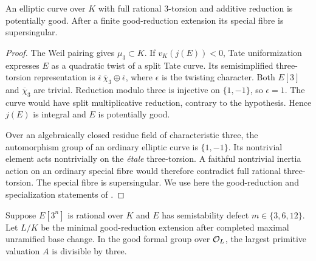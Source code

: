 \begin{lemma}\label{lem:additive-potential}
An elliptic curve over $K$ with full rational $3$-torsion and additive reduction is potentially good. After a finite good-reduction extension its special fibre is supersingular.
\end{lemma}

\begin{proof}
The Weil pairing gives $\mu_3\subset K$. If $v_K(j(E))<0$, Tate uniformization expresses $E$ as a quadratic twist of a split Tate curve. Its semisimplified three-torsion representation is
$\overline\epsilon\,\overline\chi_3\oplus\overline\epsilon$, where $\epsilon$ is the twisting character. Both $E[3]$ and $\overline\chi_3$ are trivial. Reduction modulo three is injective on $\{1,-1\}$, so $\epsilon=1$. The curve would have split multiplicative reduction, contrary to the hypothesis. Hence $j(E)$ is integral and $E$ is potentially good.

Over an algebraically closed residue field of characteristic three, the automorphism group of an ordinary elliptic curve is $\{1,-1\}$. Its nontrivial element acts nontrivially on the \emph{\'etale} three-torsion. A faithful nontrivial inertia action on an ordinary special fibre would therefore contradict full rational three-torsion. The special fibre is supersingular. We use here the good-reduction and specialization statements of \citet[Theorems~1--2 and Corollary~2 to Theorem~2, pp.~493, 496--497]{SerreTate1968}.
\end{proof}

\begin{lemma}\label{lem:wild-divisibility}
Suppose $E[3^n]$ is rational over $K$ and $E$ has semistability defect $m\in\{3,6,12\}$. Let $L/K$ be the minimal good-reduction extension after completed maximal unramified base change. In the good formal group over $\mathcal O_L$, the largest primitive valuation $A$ is divisible by three.
\end{lemma}

